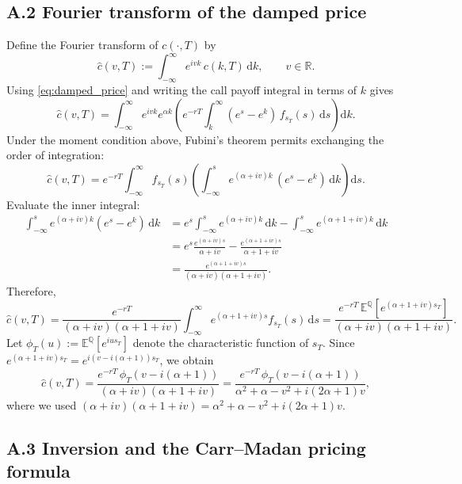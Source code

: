 \documentclass[a4paper,titlepage,12pt]{report}
\theoremstyle{plain}
\begin{document}
\subsection*{A.2 Fourier transform of the damped price}

\noindent
Define the Fourier transform of $c(\cdot,T)$ by
\[
\widehat{c}(v,T)
:=
\int_{-\infty}^{\infty} e^{ivk}\,c(k,T)\,\mathrm{d}k,
\qquad v\in\mathbb{R}.
\]
Using \eqref{eq:damped_price} and writing the call payoff integral in terms of $k$ gives
\[
\widehat{c}(v,T)
=
\int_{-\infty}^{\infty} e^{ivk} e^{\alpha k}
\left(
e^{-rT}\int_{k}^{\infty}(e^{s}-e^{k})\,f_{s_T}(s)\,\mathrm{d}s
\right)\mathrm{d}k.
\]
Under the moment condition above, Fubini's theorem permits exchanging the order of integration:
\[
\widehat{c}(v,T)
=
e^{-rT}\int_{-\infty}^{\infty} f_{s_T}(s)
\left(
\int_{-\infty}^{s} e^{(\alpha+iv)k}\,(e^{s}-e^{k})\,\mathrm{d}k
\right)\mathrm{d}s.
\]
Evaluate the inner integral:
\begin{align*}
\int_{-\infty}^{s} e^{(\alpha+iv)k}(e^{s}-e^{k})\,\mathrm{d}k
&=
e^{s}\int_{-\infty}^{s} e^{(\alpha+iv)k}\,\mathrm{d}k
-
\int_{-\infty}^{s} e^{(\alpha+1+iv)k}\,\mathrm{d}k \\
&=
e^{s}\frac{e^{(\alpha+iv)s}}{\alpha+iv}
-
\frac{e^{(\alpha+1+iv)s}}{\alpha+1+iv} \\
&=
\frac{e^{(\alpha+1+iv)s}}{(\alpha+iv)(\alpha+1+iv)}.
\end{align*}
Therefore,
\[
\widehat{c}(v,T)
=
\frac{e^{-rT}}{(\alpha+iv)(\alpha+1+iv)}
\int_{-\infty}^{\infty} e^{(\alpha+1+iv)s} f_{s_T}(s)\,\mathrm{d}s
=
\frac{e^{-rT}\,\mathbb{E}^{\mathbb{Q}}\!\left[e^{(\alpha+1+iv)s_T}\right]}
{(\alpha+iv)(\alpha+1+iv)}.
\]
Let $\phi_T(u):=\mathbb{E}^{\mathbb{Q}}[e^{iu s_T}]$ denote the characteristic function of $s_T$.
Since $e^{(\alpha+1+iv)s_T}=e^{i(v-i(\alpha+1))s_T}$, we obtain
\begin{equation}
\widehat{c}(v,T)
=
\frac{e^{-rT}\,\phi_T\!\left(v-i(\alpha+1)\right)}
{(\alpha+iv)(\alpha+1+iv)}
=
\frac{e^{-rT}\,\phi_T\!\left(v-i(\alpha+1)\right)}
{\alpha^2+\alpha-v^2+i(2\alpha+1)v},
\label{eq:psi_transform}
\end{equation}
where we used $(\alpha+iv)(\alpha+1+iv)=\alpha^2+\alpha-v^2+i(2\alpha+1)v$.

\subsection*{A.3 Inversion and the Carr--Madan pricing formula}
\end{document}
